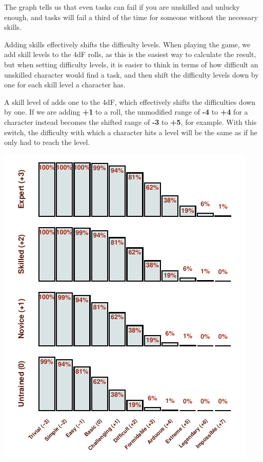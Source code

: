 The graph tells us that even \Trivial tasks can fail if you are unskilled and unlucky enough, and \Challenging tasks will fail a third of the time for someone without the necessary skills.

Adding skills effectively shifts the difficulty levels. When playing the game, we add skill levels to the 4dF rolls, as this is the easiest way to calculate the result, but when setting difficulty levels, it is easier to think in terms of how difficult an unskilled character would find a task, and then shift the difficulty levels down by one for each skill level a character has.

A skill level of \Novice adds one to the 4dF, which effectively shifts the difficulties down by one. If we are adding \textbf{+1} to a roll, the unmodified range of \textbf{-4} to \textbf{+4} for a \Untrained character instead becomes the shifted range of \textbf{-3} to \textbf{+5}, for example. With this switch, the difficulty with which a \Novice character hits a \Challenging level will be the same as if he only had to reach the \Basic level.

\begin{center}
	\includegraphics{stats/shifted-DR.pdf}
\end{center}

